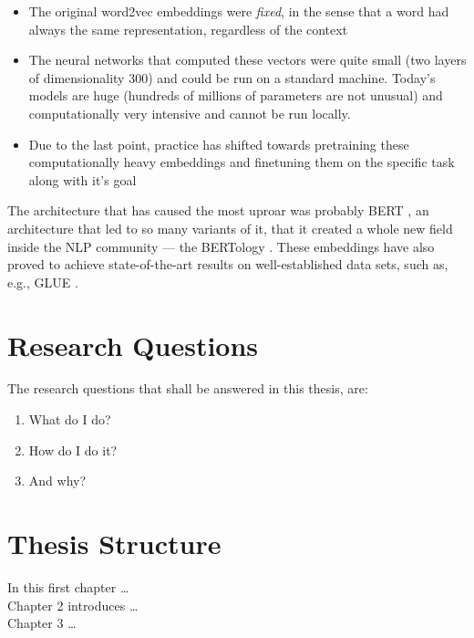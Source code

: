 \begin{itemize}
	\item The original word2vec embeddings were \emph{fixed}, in the sense that a word had always
					the same representation, regardless of the context
	\item The neural networks that computed these vectors were quite small (two layers of dimensionality
					300) and could be run on a standard machine.
					Today's models are huge (hundreds of millions of parameters are not unusual) and computationally
					very intensive and cannot be run locally.
	\item Due to the last point, practice has shifted towards pretraining these computationally heavy
					embeddings and finetuning them on the specific task along with it's goal
\end{itemize}

The architecture that has caused the most uproar was probably BERT \cite{devlin2018bert}, an architecture
that led to so many variants of it, that it created a whole new field inside the NLP community ---
the BERTology \cite{rogers2020primer}.
These embeddings have also proved to achieve state-of-the-art results on well-established data sets,
such as, e.g., GLUE \cite{wang2018glue}.

\section{Research Questions}

The research questions that shall be answered in this thesis, are:
\begin{enumerate}
 \item What do I do?
 \item How do I do it?
 \item And why?
\end{enumerate}

\section{Thesis Structure}
In this first chapter \ldots\\
Chapter 2 introduces \ldots\\
Chapter 3 \ldots


